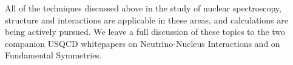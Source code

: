 All of the techniques discussed above in the study of nuclear spectroscopy, structure and interactions are applicable in these areas, and calculations are being actively pursued. We leave a full discussion of these topics to the two companion USQCD whitepapers on Neutrino-Nucleus Interactions and on Fundamental Symmetries.



